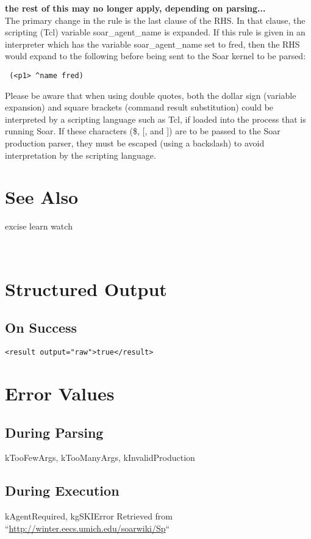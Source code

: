\documentclass[10pt]{article}
\begin{document}
 \textbf{ the rest of this may no longer apply, depending on parsing...}
\\ 
 The primary change in the rule is the last clause of the RHS. In that clause, the scripting (Tcl) variable soar\_agent\_name is expanded. If this rule is given in an interpreter which has the variable soar\_agent\_name set to fred, then the RHS would expand to the following before being sent to the Soar kernel to be parsed: \begin{verbatim}
 (<p1> ^name fred)

\end{verbatim}



 Please be aware that when using double quotes, both the dollar sign (variable expansion) and square brackets (command result substitution) could be interpreted by a scripting language such as Tcl, if loaded into the process that is running Soar. If these characters (\$, [, and ]) are to be passed to the Soar production parser, they must be escaped (using a backslash) to avoid interpretation by the scripting language. 
\section*{ See Also }


 excise learn watch


 \\ 

\section*{ Structured Output }
\subsection*{ On Success }
\begin{verbatim}
<result output="raw">true</result>

\end{verbatim}
\section*{ Error Values }
\subsection*{ During Parsing }


 kTooFewArgs, kTooManyArgs, kInvalidProduction
\subsection*{ During Execution }


 kAgentRequired, kgSKIError Retrieved from ``\url{http://winter.eecs.umich.edu/soarwiki/Sp}``
\end{document}
